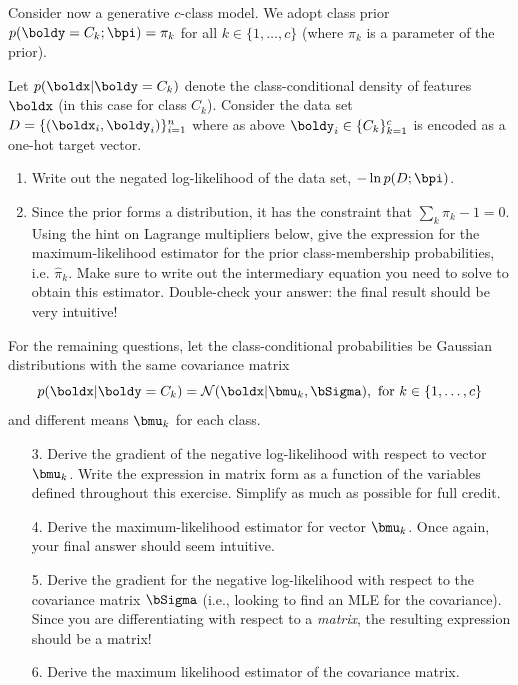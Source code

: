 \documentclass[submit]{harvardml}
\begin{document}
\begin{problem}

  Consider now a generative $c$-class model.  We adopt class prior
  $p(\boldy = C_k; \bpi) = \pi_k$ for all $k \in \{1, \ldots, c\}$
(where $\pi_k$ is a parameter of the prior).
%

Let  $p(\boldx|\boldy=C_k)$ denote
the class-conditional density of features $\boldx$ (in this
case for class $C_k$). Consider the data set $D = \{(\boldx_i,
\boldy_i)\}_{i=1}^n$ where as above $\boldy_i \in \{C_k\}_{k=1}^c$ is
encoded as a one-hot target vector. 
%
\begin{enumerate}
  \item Write out the negated log-likelihood of the data set,
    $-\ln p(D ; \bpi)$.
%
  \item Since the prior forms a distribution, it has the constraint that
    $\sum_k\pi_k - 1 = 0$.  Using the hint on
Lagrange multipliers below, give the
    expression for the maximum-likelihood estimator for the prior
    class-membership probabilities, i.e.
    $\hat \pi_k.$
    Make sure to write out the intermediary equation you need
    to solve to obtain this estimator. Double-check your answer: the final
    result should be very intuitive!
\end{enumerate}

    For the remaining questions, let the 
    class-conditional probabilities be Gaussian distributions with 
the same covariance matrix
    $$p(\boldx | \boldy = C_k) = \mathcal{N}(\boldx |  \bmu_k, \bSigma), \text{\ for\ }k \in \{1,\ldots, c\}$$
%
and different means $\bmu_k$ for each class.
%
    \begin{enumerate}
  \item[3.] Derive the gradient of the negative log-likelihood with respect to vector $\bmu_k$.
    Write the expression in matrix form as a function of the variables defined
    throughout this exercise. Simplify as much as possible for full credit.
  \item[4.] Derive the maximum-likelihood estimator for vector $\bmu_k$. Once
    again, your final answer should seem intuitive.
  \item[5.] Derive the gradient for the negative log-likelihood with respect to the
    covariance matrix $\bSigma$ (i.e., looking
to find an MLE for the covariance). 
Since you are differentiating with respect to a
    \emph{matrix}, the resulting expression should be a matrix!
%
  \item[6.] Derive the maximum likelihood estimator of the covariance matrix.
\end{enumerate}


\end{problem}
\end{document}
